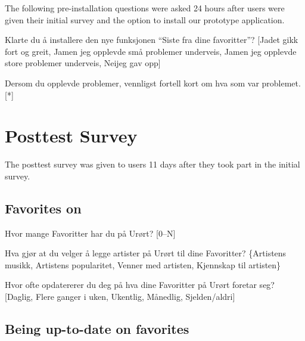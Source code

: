 The following pre-installation questions were asked 24 hours after users were
given their initial survey and the option to install our prototype
application.

\begin{enum}
  \item * Klarte du å installere den nye funksjonen ``Siste fra dine
    favoritter''?
    [Ja\dash{}det gikk fort og greit,
    Ja\dash{}men jeg opplevde små problemer underveis,
    Ja\dash{}men jeg opplevde store problemer underveis,
    Nei\dash{}jeg gav opp]
  \item Dersom du opplevde problemer, vennligst fortell kort om hva som var
    problemet. [*]
\end{enum}

\section{Posttest Survey}

The posttest survey was given to users 11 days after they took part in the
initial survey.

\subsection{Favorites on \urort{}}

\begin{enum}
  \item Hvor mange Favoritter har du på Urørt?
    [0--N]
  \item Hva gjør at du velger å legge artister på Urørt til dine Favoritter?
    \{Artistens musikk, Artistens popularitet, Venner med artisten,
    Kjennskap til artisten\}
  \item  Hvor ofte opdatererer du deg på hva dine Favoritter på Urørt
    foretar seg?
    [Daglig, Flere ganger i uken, Ukentlig, Månedlig, Sjelden/aldri]
\end{enum}

\subsection{Being up-to-date on favorites}

